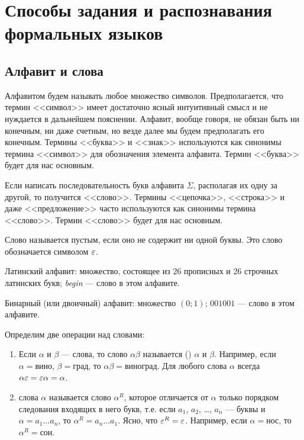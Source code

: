 \chapter{Способы задания и распознавания формальных языков}
\label{Chapter1}
\section{Алфавит и слова}
\label{Chapter1Alphabet}
Алфавитом будем называть любое множество символов. Предполагается,
что термин <<символ>> имеет достаточно ясный интуитивный смысл и не
нуждается в дальнейшем пояснении. Алфавит, вообще говоря, не обязан
быть ни конечным, ни даже счетным, но везде далее мы будем
предполагать его конечным. Термины <<буква>> и <<знак>> используются
как синонимы термина <<символ>> для обозначения элемента алфавита.
Термин <<буква>> будет для нас основным.

Если написать последовательность букв алфавита $\Sigma$, располагая их одну за другой, то получится <<слово>>. Термины <<цепочка>>, <<строка>> и даже <<предложение>> часто используются как синонимы термина <<слово>>. Термин <<слово>> будет для нас основным.

Слово называется пустым, если оно не содержит ни одной буквы. Это слово обозначается символом $\varepsilon$.

\begin{myexample}
Латинский алфавит: множество, состоящее из 26 прописных и 26 строчных латинских букв; \emph{begin} --- слово в этом алфавите.
\end{myexample}

\begin{myexample}
Бинарный (или двоичный) алфавит: множество $(0;1)$; $001001$ --- слово в этом алфавите.
\end{myexample}

Определим две операции над словами:

\begin{enumerate}%
    \item
Если $\alpha$ и $\beta$ --- слова, то слово $\alpha\beta$ называется  () $\alpha$ и $\beta$. Например, если $\alpha= \text{вино}$, $\beta=\text{град}$, то $\alpha\beta=\text{виноград}$. Для любого слова $\alpha$ всегда $\alpha\varepsilon=\varepsilon\alpha=\alpha$.

    \item
{} слова $\alpha$ называется слово $\alpha^R$, которое отличается от $\alpha$ только порядком следования входящих в него букв, т.е. если
 $a_1$, $a_2$, \ldots , $a_n$ --- буквы и $\alpha=a_1 \ldots a_n$, то $\alpha^R=a_n\ldots a_1$. Ясно, что
$\varepsilon^R=\varepsilon$. Например, если $\alpha= \text{нос}$, то $\alpha^R=\text{сон}$.
\end{enumerate}


